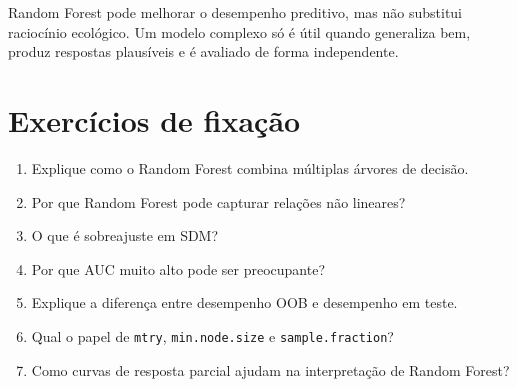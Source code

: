 \begin{conceito}[title={\faBook\quad Mensagem central}]
	Random Forest pode melhorar o desempenho preditivo, mas não substitui raciocínio ecológico. Um modelo complexo só é útil quando generaliza bem, produz respostas plausíveis e é avaliado de forma independente.
\end{conceito}

\section{Exercícios de fixação}

\begin{enumerate}
	\item Explique como o Random Forest combina múltiplas árvores de decisão.
	\item Por que Random Forest pode capturar relações não lineares?
	\item O que é sobreajuste em SDM?
	\item Por que AUC muito alto pode ser preocupante?
	\item Explique a diferença entre desempenho OOB e desempenho em teste.
	\item Qual o papel de \texttt{mtry}, \texttt{min.node.size} e \texttt{sample.fraction}?
	\item Como curvas de resposta parcial ajudam na interpretação de Random Forest?
\end{enumerate}


